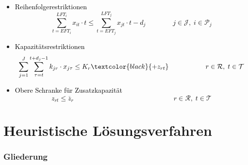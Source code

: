 \begin{frame}
\begin{footnotesize}
{\begin{itemize}
				\item[] \textcolor{black}{Reihenfolgerestriktionen
					\[
					\sum_{t=EFT_i}^{LFT_i} x_{it} \cdot t \leq \sum_{t=EFT_j}^{LFT_j} x_{jt} \cdot t - d_j \,\,\:\:\:\quad\quad\quad j \in \mathcal{J}, \; i \in \mathcal{P}_j
					\]}
				
				\item[] \textcolor{black}{Kapazitätsrestriktionen
					\[
					\sum_{j=1}^{J} \sum_{\tau=t}^{t+d_j-1} k_{jr} \cdot x_{j\tau} \leq K_r \textcolor{black}{+ z_{rt}} \,\,\:\:\:\:\:\quad\quad\quad\quad r \in \mathcal{R}, \; t \in \mathcal{T}
					\]}
				
				\item[] \textcolor{black}{Obere Schranke für Zusatzkapazität\\[-3mm]
					\[
					z_{rt} \leq \overline{z}_r \,\;\;\quad\quad\quad\quad\quad\quad\quad\quad\quad\quad\quad\quad\quad\quad r \in \mathcal{R}, \; t \in \mathcal{T}
					\]}
			\end{itemize}
		}
		
	\end{footnotesize}
\end{frame}


\section{Heuristische Lösungsverfahren}

\begin{frame}[noframenumbering]
\frametitle{Gliederung}
\end{frame}

